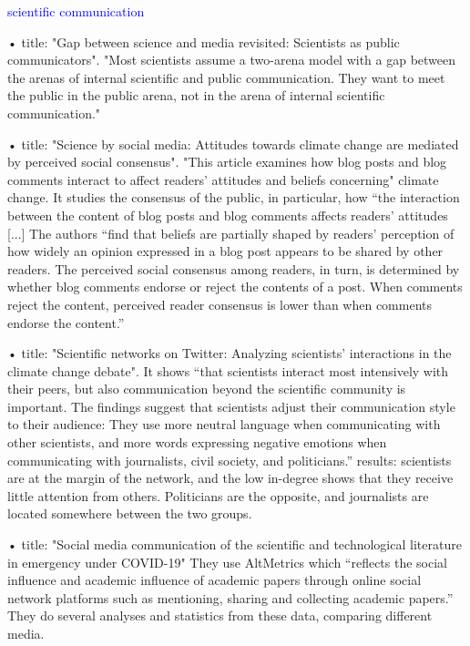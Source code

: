 \begin{itemize}
\textcolor{blue}{scientific communication}

• \cite{peters2013gap} title: "Gap between science and media revisited: Scientists as public communicators". 
"Most scientists assume a two-arena model with a gap between the arenas of internal scientific and public communication. They want to meet the public in the public arena, not in the arena of internal scientific communication."

• \cite{lewandowsky2019science} title: "Science by social media: Attitudes towards climate change are mediated by perceived social consensus". "This article examines how blog posts and blog comments interact to affect readers’ attitudes and beliefs concerning" climate change. It studies the consensus of the public, in particular, how “the interaction between the content of blog posts and blog comments affects readers’ attitudes [...] The authors “find that beliefs are partially shaped by readers’ perception of how widely an opinion expressed in a blog post appears to be shared by other readers. The perceived social consensus among readers, in turn, is determined by whether blog comments endorse or reject the contents of a post. When comments reject the content, perceived reader consensus is lower than when comments endorse the content.” 

• \cite{walter2019scientific} title: "Scientific networks on Twitter: Analyzing scientists' interactions in the climate change debate". It shows “that scientists interact most intensively with their peers, but also communication beyond the scientific community is important. The findings suggest that scientists adjust their communication style to their audience: They use more neutral language when communicating with other scientists, and more words expressing negative emotions when communicating with journalists, civil society, and politicians.”
results: scientists are at the margin of the network, and the low in-degree shows that they receive little attention from others. Politicians are the opposite, and journalists are located somewhere between the two groups.

• \cite{li2021social} title: "Social media communication of the scientific and technological literature in emergency under COVID-19" They use AltMetrics which “reflects the social influence and academic influence of academic papers through online social network platforms such as mentioning, sharing and collecting academic papers.” They do several analyses and statistics from these data, comparing different media.


\end{itemize}
